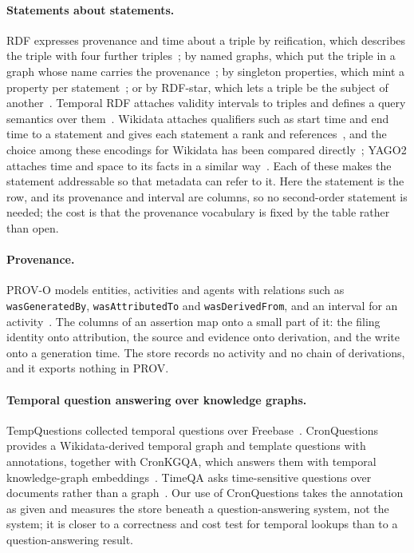 \paragraph{Statements about statements.}
RDF expresses provenance and time about a triple by reification, which describes
the triple with four further triples~\cite{rdf11semantics}; by named graphs,
which put the triple in a graph whose name carries the
provenance~\cite{carroll2005named}; by singleton properties, which mint a
property per statement~\cite{nguyen2014singleton}; or by RDF-star, which lets a
triple be the subject of another~\cite{hartig2017rdfstar}. Temporal RDF attaches
validity intervals to triples and defines a query semantics over
them~\cite{gutierrez2005temporal}. Wikidata attaches qualifiers such as start
time and end time to a statement and gives each statement a rank and
references~\cite{vrandecic2014wikidata}, and the choice among these encodings for
Wikidata has been compared directly~\cite{hernandez2015reifying}; YAGO2 attaches
time and space to its facts in a similar way~\cite{hoffart2013yago2}. Each of
these makes the statement addressable so that metadata can refer to it. Here the
statement is the row, and its provenance and interval are columns, so no
second-order statement is needed; the cost is that the provenance vocabulary is
fixed by the table rather than open.

\paragraph{Provenance.}
PROV-O models entities, activities and agents with relations such as
\texttt{wasGeneratedBy}, \texttt{wasAttributedTo} and
\texttt{wasDerivedFrom}, and an interval for an activity~\cite{lebo2013provo}.
The columns of an assertion map onto a small part of it: the filing identity
onto attribution, the source and evidence onto derivation, and the write onto a
generation time. The store records no activity and no chain of derivations, and
it exports nothing in PROV.

\paragraph{Temporal question answering over knowledge graphs.}
TempQuestions collected temporal questions over Freebase~\cite{jia2018tempquestions}.
CronQuestions provides a Wikidata-derived temporal graph and template questions
with annotations, together with CronKGQA, which answers them with temporal
knowledge-graph embeddings~\cite{saxena2021cronquestions}. TimeQA asks
time-sensitive questions over documents rather than a graph~\cite{chen2021timeqa}.
Our use of CronQuestions takes the annotation as given and measures the store
beneath a question-answering system, not the system; it is closer to a
correctness and cost test for temporal lookups than to a question-answering
result.

